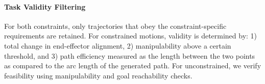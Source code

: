 
\paragraph{Task Validity Filtering}
For both constraints, only trajectories that obey the constraint-specific requirements are retained. For constrained motions, validity is determined by: 1) total change in end-effector alignment, 2) manipulability above a certain threshold, and 3) path efficiency measured as the length between the two points as compared to the arc length of the generated path. For unconstrained, we verify feasibility using manipulability and goal reachability checks.







